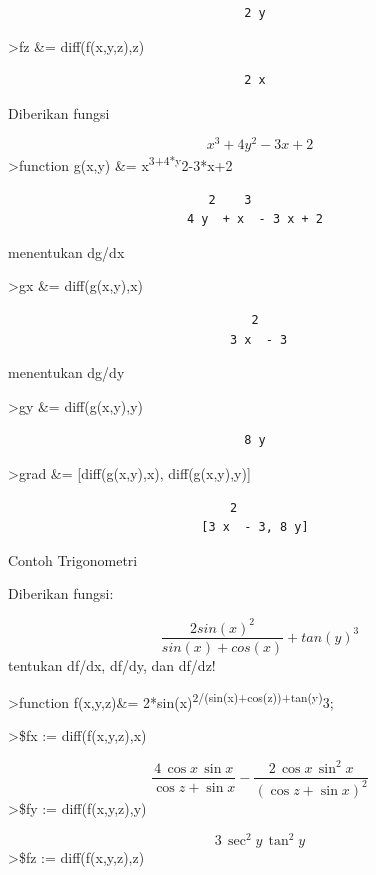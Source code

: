 \documentclass[
]{book}
\begin{document}
\begin{verbatim}
                                 2 y
\end{verbatim}

\textgreater fz \&= diff(f(x,y,z),z)

\begin{verbatim}
                                 2 x
\end{verbatim}

Diberikan fungsi

\[x^3+4y^2-3x+2\]\textgreater function g(x,y) \&= x\textsuperscript{3+4*y}2-3*x+2

\begin{verbatim}
                            2    3
                         4 y  + x  - 3 x + 2
\end{verbatim}

menentukan dg/dx

\textgreater gx \&= diff(g(x,y),x)

\begin{verbatim}
                                  2
                               3 x  - 3
\end{verbatim}

menentukan dg/dy

\textgreater gy \&= diff(g(x,y),y)

\begin{verbatim}
                                 8 y
\end{verbatim}

\textgreater grad \&= {[}diff(g(x,y),x), diff(g(x,y),y){]}

\begin{verbatim}
                               2
                           [3 x  - 3, 8 y]
\end{verbatim}

Contoh Trigonometri

Diberikan fungsi:

\[\frac{2sin(x)^2}{sin(x)+cos(x)}+tan (y)^3\]tentukan df/dx, df/dy, dan df/dz!

\textgreater function f(x,y,z)\&= 2*sin(x)\textsuperscript{2/(sin(x)+cos(z))+tan(y)}3;

\textgreater\$fx := diff(f(x,y,z),x)

\[\frac{4\,\cos x\,\sin x}{\cos z+\sin x}-\frac{2\,\cos x\,\sin ^2x}{  \left(\cos z+\sin x\right)^2}\]\textgreater\$fy := diff(f(x,y,z),y)

\[3\,\sec ^2y\,\tan ^2y\]\textgreater\$fz := diff(f(x,y,z),z)
\end{document}
